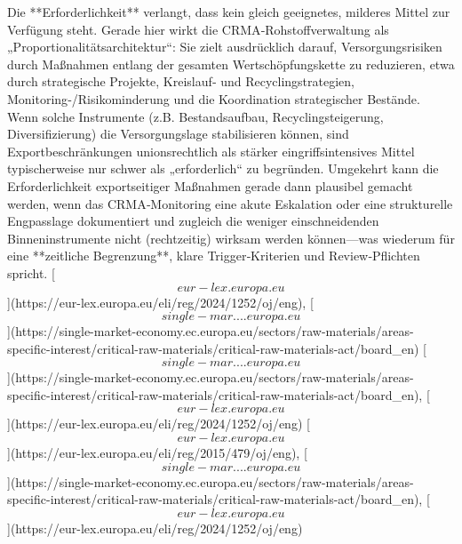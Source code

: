 \documentclass[12pt,a4paper,oneside]{book} %
\begin{document}
Die **Erforderlichkeit** verlangt, dass kein gleich geeignetes, milderes Mittel zur Verfügung steht. Gerade hier wirkt die CRMA‑Rohstoffverwaltung als „Proportionalitätsarchitektur“: Sie zielt ausdrücklich darauf, Versorgungsrisiken durch Maßnahmen entlang der gesamten Wertschöpfungskette zu reduzieren, etwa durch strategische Projekte, Kreislauf‑ und Recyclingstrategien, Monitoring‑/Risikominderung und die Koordination strategischer Bestände.  Wenn solche Instrumente (z.B. Bestandsaufbau, Recyclingsteigerung, Diversifizierung) die Versorgungslage stabilisieren können, sind Exportbeschränkungen unionsrechtlich als stärker eingriffsintensives Mittel typischerweise nur schwer als „erforderlich“ zu begründen.  Umgekehrt kann die Erforderlichkeit exportseitiger Maßnahmen gerade dann plausibel gemacht werden, wenn das CRMA‑Monitoring eine akute Eskalation oder eine strukturelle Engpasslage dokumentiert und zugleich die weniger einschneidenden Binneninstrumente nicht (rechtzeitig) wirksam werden können—was wiederum für eine **zeitliche Begrenzung**, klare Trigger‑Kriterien und Review‑Pflichten spricht. [\[eur-lex.europa.eu\]](https://eur-lex.europa.eu/eli/reg/2024/1252/oj/eng), [\[single-mar....europa.eu\]](https://single-market-economy.ec.europa.eu/sectors/raw-materials/areas-specific-interest/critical-raw-materials/critical-raw-materials-act/board_en) [\[single-mar....europa.eu\]](https://single-market-economy.ec.europa.eu/sectors/raw-materials/areas-specific-interest/critical-raw-materials/critical-raw-materials-act/board_en), [\[eur-lex.europa.eu\]](https://eur-lex.europa.eu/eli/reg/2024/1252/oj/eng) [\[eur-lex.europa.eu\]](https://eur-lex.europa.eu/eli/reg/2015/479/oj/eng), [\[single-mar....europa.eu\]](https://single-market-economy.ec.europa.eu/sectors/raw-materials/areas-specific-interest/critical-raw-materials/critical-raw-materials-act/board_en), [\[eur-lex.europa.eu\]](https://eur-lex.europa.eu/eli/reg/2024/1252/oj/eng)
\end{document}
